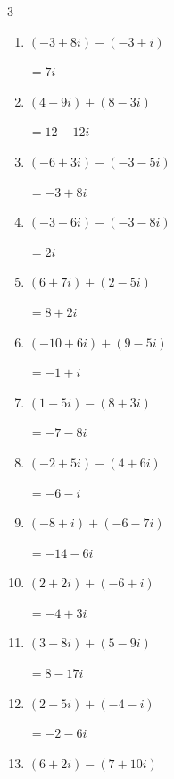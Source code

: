 \begin{multicols}{3}
\begin{enumerate}
        $\displaystyle =-14+12i$

  \item $\displaystyle (-3+8i) - (-3+i)$

        $\displaystyle =7i$

  \item $\displaystyle (4-9i) + (8-3i)$

        $\displaystyle =12-12i$

  \item $\displaystyle (-6+3i) - (-3-5i)$

        $\displaystyle =-3+8i$

  \item $\displaystyle (-3-6i) - (-3-8i)$

        $\displaystyle =2i$

\columnbreak %

\resetques

  \item $\displaystyle (6+7i) + (2-5i)$

        $\displaystyle =8+2i$

  \item $\displaystyle (-10+6i) + (9-5i)$

        $\displaystyle =-1+i$

  \item $\displaystyle (1-5i) - (8+3i)$

        $\displaystyle =-7-8i$

  \item $\displaystyle (-2+5i) - (4+6i)$

        $\displaystyle =-6-i$

  \item $\displaystyle (-8+i) + (-6-7i)$

        $\displaystyle =-14-6i$

  \item $\displaystyle (2+2i) + (-6+i)$

        $\displaystyle =-4+3i$

  \item $\displaystyle (3-8i) + (5-9i)$

        $\displaystyle =8-17i$

  \item $\displaystyle (2-5i) + (-4-i)$

        $\displaystyle =-2-6i$

  \item $\displaystyle (6+2i) - (7+10i)$


\end{enumerate}
\end{multicols}
